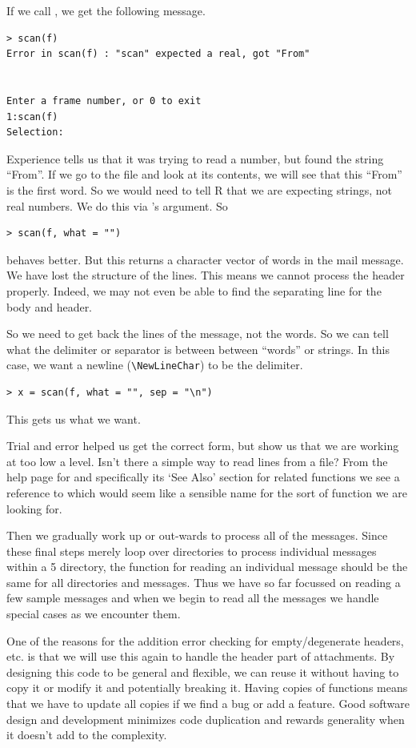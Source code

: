If we call ,
we get the following message.
\begin{verbatim}
> scan(f)
Error in scan(f) : "scan" expected a real, got "From"


Enter a frame number, or 0 to exit   
1:scan(f) 
Selection: 
\end{verbatim}
Experience tells us that it was trying to read
a number, but found the string ``From''.
If we go to the file and look at its contents, we
will see that this ``From'' is the first word.
So we would need to tell R that we are expecting
strings, not real numbers. We do this via
's 
 argument.
So
\begin{verbatim}
> scan(f, what = "")
\end{verbatim}
behaves better.  But this returns a character vector of words in the
mail message.  We have lost the structure of the lines.
This means we cannot process the header properly.
Indeed, we may not even be able to find the separating
line for the body and header.

So we need to get back the lines of the message, not the words.
So we can tell 
what the delimiter or separator is between between ``words'' or strings.
In this case, we want a newline (\verb+\NewLineChar+) to  be the delimiter.
\begin{verbatim}
> x = scan(f, what = "", sep = "\n")
\end{verbatim}
This gets us what we want.

Trial and error helped us get the correct form, but
show us that we are working at too low a level. 
Isn't there a simple way to read lines from a file?  
From the help page for  and specifically 
its `See Also' section for related functions we see a reference
to  which would seem like a
sensible name for the sort of function we are looking for.  

Then we gradually work up or out-wards to process all 
of the messages.  
Since these final steps merely loop over directories 
to process individual messages within a 5 directory, 
the function for reading an individual message should be 
the same for all directories and messages. 
Thus we have so far focussed on reading a few sample messages
and when we begin to read all the messages we handle special 
cases as we encounter them.

One of  the reasons for the addition error checking for
empty/degenerate headers, etc. is that we will use this again to
handle the header part of attachments. By designing this code to be
general and flexible, we can reuse it without having to copy it or
modify it and potentially breaking it.  Having copies of functions
means that we have to update all copies if we find a bug or add a
feature.  Good software design and development minimizes code
duplication and rewards generality when it doesn't add to the
complexity.

